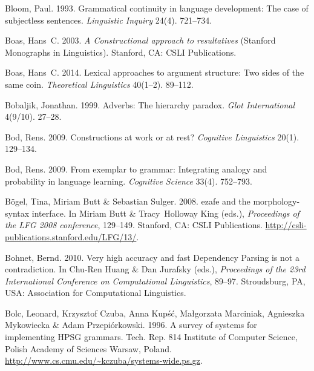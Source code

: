 \begin{thebibliography}{1420}
Bloom, Paul. 1993.
\newblock Grammatical continuity in language development: {The} case of
  subjectless sentences.
\newblock \emph{Linguistic Inquiry} 24(4). 721--734.

Boas, Hans~C. 2003.
\newblock \emph{A {Constructional} approach to resultatives}  (Stanford
  Monographs in Linguistics).
\newblock Stanford, CA: CSLI Publications.

Boas, Hans~C. 2014.
\newblock Lexical approaches to argument structure: {Two} sides of the same
  coin.
\newblock \emph{Theoretical Linguistics} 40(1--2). 89--112.

Bobaljik, Jonathan. 1999.
\newblock Adverbs: {The} hierarchy paradox.
\newblock \emph{Glot International} 4(9/10). 27--28.

Bod, Rens. 2009{}.
\newblock Constructions at work or at rest?
\newblock \emph{Cognitive Linguistics} 20(1). 129--134.

Bod, Rens. 2009{}.
\newblock From exemplar to grammar: Integrating analogy and probability in
  language learning.
\newblock \emph{Cognitive Science} 33(4). 752--793.

B{\"o}gel, Tina, Miriam Butt \& Sebastian Sulger. 2008.
 ezafe and the morphology-syntax interface.
\newblock In Miriam Butt \& Tracy~Holloway King (eds.), \emph{Proceedings of
  the {LFG 2008} conference}, 129--149. Stanford, CA: CSLI Publications.
\newblock \urlprefix\url{http://csli-publications.stanford.edu/LFG/13/}.

Bohnet, Bernd. 2010.
\newblock Very high accuracy and fast {Dependency Parsing} is not a
  contradiction.
\newblock In Chu-Ren Huang \& Dan Jurafsky (eds.), \emph{Proceedings of the
  {23rd International Conference on Computational Linguistics}}, 89--97.
  Stroudsburg, PA, USA: Association for Computational Linguistics.

Bolc, Leonard, Krzysztof Czuba, Anna Kup{\'s}{\'c}, Ma{\l}gorzata Marciniak,
  Agnieszka Mykowiecka \& Adam Przepi{\'o}rkowski. 1996.
\newblock A survey of systems for implementing {HPSG} grammars.
\newblock Tech. Rep. 814 Institute of Computer Science, Polish Academy of
  Sciences Warsaw, Poland.
\newblock \urlprefix\url{http://www.cs.cmu.edu/~kczuba/systems-wide.ps.gz}.


\end{thebibliography}
